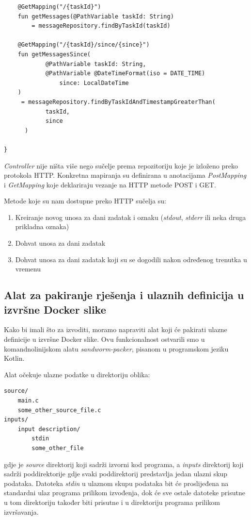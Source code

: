 \documentclass[times, utf8, zavrsni]{fer}
\begin{document}
{\begin{lstlisting}
    @GetMapping("/{taskId}")
    fun getMessages(@PathVariable taskId: String)
	 	= messageRepository.findByTaskId(taskId)

    @GetMapping("/{taskId}/since/{since}")
    fun getMessagesSince(
            @PathVariable taskId: String,
            @PathVariable @DateTimeFormat(iso = DATE_TIME)
				since: LocalDateTime
    )
     = messageRepository.findByTaskIdAndTimestampGreaterThan(
	  		taskId,
			since
	  )

}
\end{lstlisting}

{\textit{Controller}} nije ništa više nego sučelje prema repozitoriju koje je izloženo preko protokola HTTP. Konkretna mapiranja su definirana u anotacijama {\textit{PostMapping}} i {\textit{GetMapping}} koje deklariraju vezanje na HTTP metode POST i GET.

\hfill
\break

Metode koje su nam dostupne preko HTTP sučelja su:

\begin{enumerate}
\item Kreiranje novog unosa za dani zadatak i oznaku ({\textit{stdout}}, {\textit{stderr}} ili neka druga prikladna oznaka)
\item Dohvat unosa za dani zadatak
\item Dohvat unosa za dani zadatak koji su se dogodili nakon određenog trenutka u vremenu
\end{enumerate}

\subsection{Alat za pakiranje rješenja i ulaznih definicija u izvršne Docker slike}
\label{sec:packer}

Kako bi imali što za izvoditi, moramo napraviti alat koji će pakirati ulazne definicije u izvršne Docker slike. Ovu funkcionalnost ostvarili smo u komandnolinijskom alatu {\textit{sandworm-packer}}, pisanom u programskom jeziku Kotlin.

Alat očekuje ulazne podatke u direktoriju oblika:

\begin{lstlisting}
source/
    main.c
    some_other_source_file.c
inputs/
    input description/
        stdin
        some_other_file
\end{lstlisting}

gdje je {\textit{source}} direktorij koji sadrži izvorni kod programa, a {\textit{inputs}} direktorij koji sadrži poddirektorije gdje svaki poddirektorij predstavlja jedan ulazni skup podataka. Datoteka {\textit{stdin}} u ulaznom skupu podataka bit će proslijeđena na standardni ulaz programa prilikom izvođenja, dok će sve ostale datoteke prisutne u tom direktoriju također biti prisutne i u direktoriju programa prilikom izvršavanja.

}
\end{document}
